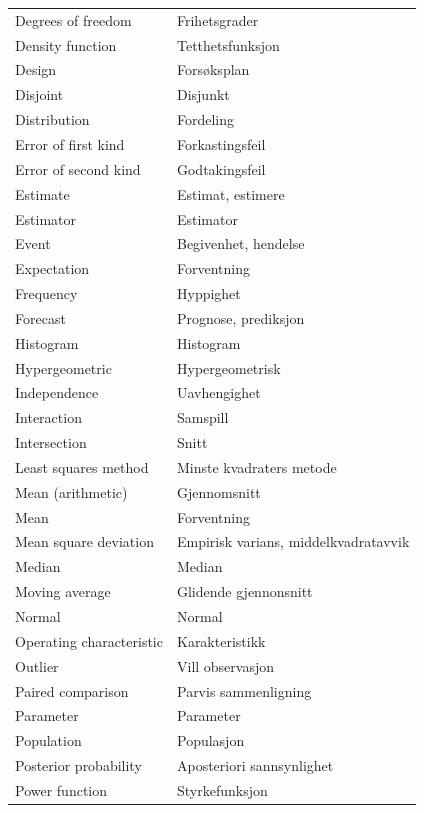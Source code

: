 \begin{center}
\begin{tabular}{ll}
Degrees of freedom & Frihetsgrader \\
Density function & Tetthetsfunksjon \\
Design           & Forsøksplan \\
Disjoint         & Disjunkt  \\
Distribution     & Fordeling \\
Error of first kind & Forkastingsfeil \\
Error of second kind & Godtakingsfeil \\
Estimate         & Estimat, estimere \\
Estimator        & Estimator \\
Event            & Begivenhet, hendelse \\
Expectation      & Forventning \\
Frequency        & Hyppighet \\
Forecast         & Prognose, prediksjon \\
Histogram        & Histogram \\
Hypergeometric   & Hypergeometrisk \\
Independence     & Uavhengighet \\
Interaction      & Samspill \\
Intersection     & Snitt \\
Least squares method & Minste kvadraters metode \\
Mean (arithmetic) & Gjennomsnitt \\
Mean             & Forventning \\
Mean square deviation & Empirisk varians, middelkvadratavvik \\
Median           & Median \\
Moving average   & Glidende gjennonsnitt \\
Normal           & Normal \\
Operating characteristic & Karakteristikk \\
Outlier          & Vill observasjon \\
Paired comparison & Parvis sammenligning \\
Parameter        & Parameter \\
Population       & Populasjon \\
Posterior probability & Aposteriori sannsynlighet \\
Power function   & Styrkefunksjon \\

\end{tabular}
\end{center}
